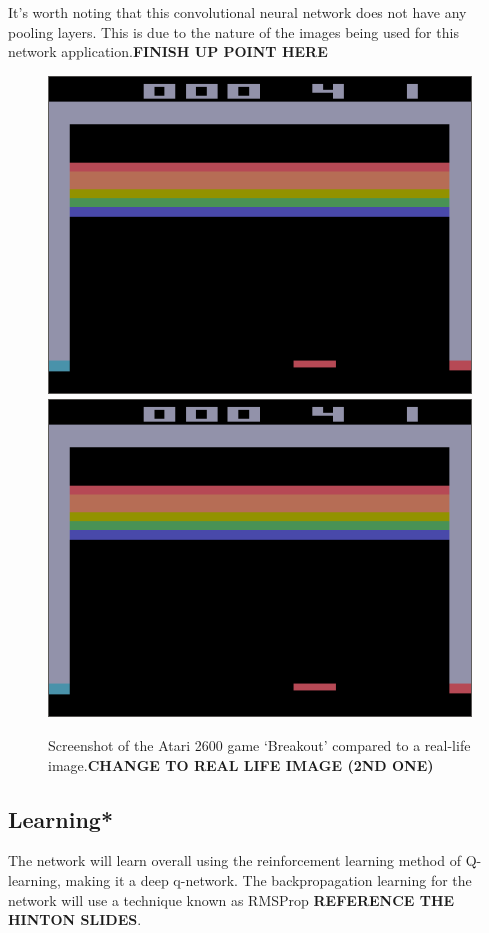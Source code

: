 \documentclass[10pt]{article}
\begin{document}
		It's worth noting that this convolutional neural network does not have any pooling layers. This is due to the nature of the images being used for this network application.\textbf{FINISH UP POINT HERE}\\
		
		\begin{figure}[h]				
			\includegraphics[scale=0.5]{img/screenshot}
			\includegraphics[scale=0.5]{img/screenshot}
			\centering
			\caption{Screenshot of the Atari 2600 game `Breakout' compared to a real-life image.\textbf{CHANGE TO REAL LIFE IMAGE (2ND ONE)}}
			\label{fig:screenshot}
		\end{figure}
	
	\bigskip
	
	\subsection{Learning*}
		The network will learn overall using the reinforcement learning method of Q-learning, making it a deep q-network. The backpropagation learning for the network will use a technique known as RMSProp \textbf{REFERENCE THE HINTON SLIDES}.\\
		
\end{document}
